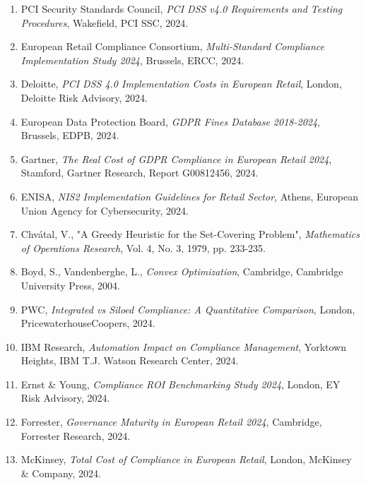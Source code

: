 \begin{enumerate}
\item PCI Security Standards Council, \textit{PCI DSS v4.0 Requirements and Testing Procedures}, Wakefield, PCI SSC, 2024.

\item European Retail Compliance Consortium, \textit{Multi-Standard Compliance Implementation Study 2024}, Brussels, ERCC, 2024.

\item Deloitte, \textit{PCI DSS 4.0 Implementation Costs in European Retail}, London, Deloitte Risk Advisory, 2024.

\item European Data Protection Board, \textit{GDPR Fines Database 2018-2024}, Brussels, EDPB, 2024.

\item Gartner, \textit{The Real Cost of GDPR Compliance in European Retail 2024}, Stamford, Gartner Research, Report G00812456, 2024.

\item ENISA, \textit{NIS2 Implementation Guidelines for Retail Sector}, Athens, European Union Agency for Cybersecurity, 2024.

\item Chvátal, V., "A Greedy Heuristic for the Set-Covering Problem", \textit{Mathematics of Operations Research}, Vol. 4, No. 3, 1979, pp. 233-235.

\item Boyd, S., Vandenberghe, L., \textit{Convex Optimization}, Cambridge, Cambridge University Press, 2004.

\item PWC, \textit{Integrated vs Siloed Compliance: A Quantitative Comparison}, London, PricewaterhouseCoopers, 2024.

\item IBM Research, \textit{Automation Impact on Compliance Management}, Yorktown Heights, IBM T.J. Watson Research Center, 2024.

\item Ernst \& Young, \textit{Compliance ROI Benchmarking Study 2024}, London, EY Risk Advisory, 2024.

\item Forrester, \textit{Governance Maturity in European Retail 2024}, Cambridge, Forrester Research, 2024.

\item McKinsey, \textit{Total Cost of Compliance in European Retail}, London, McKinsey \& Company, 2024.


\end{enumerate}
